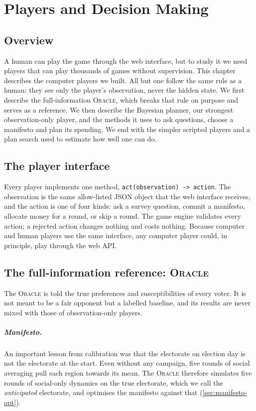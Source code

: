 \documentclass[11pt,a4paper,oneside]{report}
\newcommand{\code}[1]{\texttt{#1}}
\newcommand{\ORACLE}{\textsc{Oracle}}
\newcommand{\overviewsection}{\section{Overview}}
\begin{document}
\chapter{Players and Decision Making}\label{ch:players}

\overviewsection

A human can play the game through the web interface, but to study it we need players that can play
thousands of games without supervision. This chapter describes the computer players we built. All but one
follow the same rule as a human: they see only the player's observation, never the hidden state. We first
describe the full-information \ORACLE, which breaks that rule on purpose and serves as a reference. We then
describe the Bayesian planner, our strongest observation-only player, and the methods it uses to ask
questions, choose a manifesto and plan its spending. We end with the simpler scripted players and a plan
search used to estimate how well one can do.

\section{The player interface}

Every player implements one method, \code{act(observation) -> action}. The observation is the same
allow-listed JSON object that the web interface receives, and the action is one of four kinds: ask a
survey question, commit a manifesto, allocate money for a round, or skip a round. The game engine validates
every action; a rejected action changes nothing and costs nothing. Because computer and human players use
the same interface, any computer player could, in principle, play through the web API.

\section{The full-information reference: \ORACLE}

The \ORACLE{} is told the true preferences and susceptibilities of every voter. It is not meant to be a
fair opponent but a labelled baseline, and its results are never mixed with those of observation-only
players.

\paragraph{Manifesto.} An important lesson from calibration was that the electorate on election day is
not the electorate at the start. Even without any campaign, five rounds of social averaging pull each
region towards its mean. The \ORACLE{} therefore simulates five rounds of social-only dynamics on the true
electorate, which we call the \emph{anticipated} electorate, and optimises the manifesto against that
(\cref{sec:manifesto-opt}).
\end{document}
